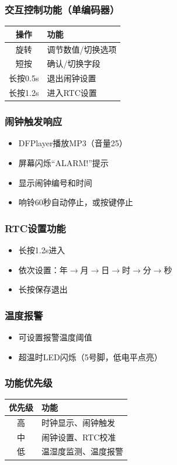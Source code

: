 \documentclass[12pt,a4paper]{article}
\begin{document}
\subsubsection*{交互控制功能（单编码器）}
\begin{table}[H]
\centering
\begin{tabular}{|c|l|}
\hline
\textbf{操作} & \textbf{功能} \\
\hline
旋转 & 调节数值/切换选项 \\
\hline
短按 & 确认/切换字段 \\
\hline
长按0.5s & 退出闹钟设置 \\
\hline
长按1.2s & 进入RTC设置 \\
\hline
\end{tabular}
\end{table}

\subsubsection*{闹钟触发响应}
\begin{itemize}
    \item DFPlayer播放MP3（音量25）
    \item 屏幕闪烁“ALARM!”提示
    \item 显示闹钟编号和时间
    \item 响铃60秒自动停止，或按键停止
\end{itemize}

\subsubsection*{RTC设置功能}
\begin{itemize}
    \item 长按1.2s进入
    \item 依次设置：年$\rightarrow$月$\rightarrow$日$\rightarrow$时$\rightarrow$分$\rightarrow$秒
    \item 长按保存退出
\end{itemize}

\subsubsection*{温度报警}
\begin{itemize}
    \item 可设置报警温度阈值
    \item 超温时LED闪烁（5号脚，低电平点亮）
\end{itemize}

\subsubsection*{功能优先级}
\begin{table}[H]
\centering
\begin{tabular}{|c|l|}
\hline
\textbf{优先级} & \textbf{功能} \\
\hline
高 & 时钟显示、闹钟触发 \\
\hline
中 & 闹钟设置、RTC校准 \\
\hline
低 & 温湿度监测、温度报警 \\
\hline
\end{tabular}
\end{table}
\end{document}
